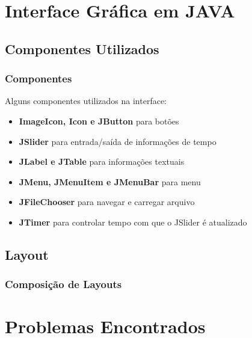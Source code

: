 \documentclass{beamer}
\begin{document}
\section{Interface Gráfica em JAVA}

\subsection{Componentes Utilizados}
\begin{frame}
	\frametitle{Componentes}
Alguns componentes utilizados na interface:	
	\begin{itemize}
		\item \textbf{ImageIcon, Icon e JButton} para botões
		\item \textbf{JSlider} para entrada/saída de informações de tempo
		\item \textbf{JLabel e JTable} para informações textuais
		\item \textbf{JMenu, JMenuItem e JMenuBar} para menu
		\item \textbf{JFileChooser} para navegar e carregar arquivo 
		\item \textbf{JTimer} para controlar tempo com que o JSlider é atualizado
	\end{itemize}
\end{frame}

\subsection{Layout}
\begin{frame}
  \frametitle{Composição de Layouts}

\end{frame}




\section{Problemas Encontrados}
\end{document}
